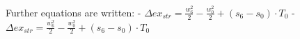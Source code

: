 Further equations are written:
- \( \Delta ex_{str} = \frac{w_6^2}{2} - \frac{w_0^2}{2} + (s_6 - s_0) \cdot T_0 \)
- \( \Delta ex_{str} = \frac{w_6^2}{2} - \frac{w_0^2}{2} + (s_6 - s_0) \cdot T_0 \)